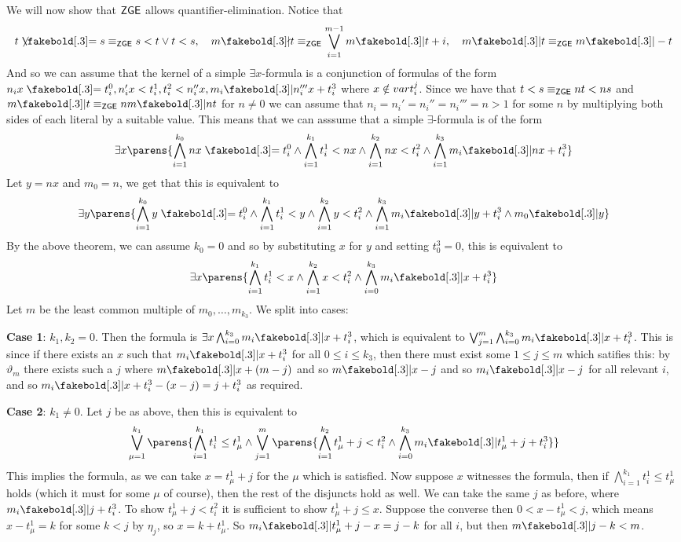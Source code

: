     We will now show that ${\sf ZGE}$ allows quantifier-elimination.
    Notice that
    $$ t\neqb s\equiv_{\sf ZGE}s<t\lor t<s,\quad m\bndivs t\equiv_{\sf ZGE}\bigvee_{i=1}^{m-1}m\bdivs t+i,\quad m\bdivs t\equiv_{\sf ZGE}m\bdivs-t $$
    And so we can assume that the kernel of a simple $\exists x$-formula is a conjunction of formulas of the form $n_ix\eq t_i^0,n_i'x<t_i^1,t_i^2<n_i''x,m_i\bdivs n_i'''x+t_i^3$ where $x\notin{\sl var} t_i^j$.
    Since we have that $t<s\equiv_{\sf ZGE}nt<ns$ and $m\bdivs t\equiv_{\sf ZGE}nm\bdivs nt$ for $n\neq0$ we can assume that $n_i=n_i'=n_i''=n_i'''=n>1$ for some $n$ by multiplying both sides of each
    literal by a suitable value.
    This means that we can asssume that a simple $\exists$-formula is of the form
    $$ \exists x\parens{\bigwedge_{i=1}^{k_0}nx\eq t_i^0\land\bigwedge_{i=1}^{k_1}t_i^1<nx\land\bigwedge_{i=1}^{k_2}nx<t_i^2\land\bigwedge_{i=1}^{k_3}m_i\bdivs nx+t_i^3} $$
    Let $y=nx$ and $m_0=n$, we get that this is equivalent to
    $$ \exists y\parens{\bigwedge_{i=1}^{k_0}y\eq t_i^0\land\bigwedge_{i=1}^{k_1}t_i^1<y\land\bigwedge_{i=1}^{k_2}y<t_i^2\land\bigwedge_{i=1}^{k_3}m_i\bdivs y+t_i^3\land m_0\bdivs y} $$
    By the above theorem, we can assume $k_0=0$ and so by substituting $x$ for $y$ and setting $t_0^3=0$, this is equivalent to
    $$ \exists x\parens{\bigwedge_{i=1}^{k_1}t_i^1<x\land\bigwedge_{i=1}^{k_2}x<t_i^2\land\bigwedge_{i=0}^{k_3}m_i\bdivs x+t_i^3} $$
    Let $m$ be the least common multiple of $m_0,\dots,m_{k_3}$.
    We split into cases:

    {\bf Case 1}: $k_1,k_2=0$.
    Then the formula is $\exists x\bigwedge_{i=0}^{k_3}m_i\bdivs x+t_i^3$, which is equivalent to $\bigvee_{j=1}^m\bigwedge_{i=0}^{k_3}m_i\bdivs x+t_i^3$.
    This is since if there exists an $x$ such that $m_i\bdivs x+t_i^3$ for all $0\leq i\leq k_3$, then there must exist some $1\leq j\leq m$ which satifies this: by $\vartheta_m$ there exists such a $j$
    where $m\bdivs x+(m-j)$ and so $m\bdivs x-j$ and so $m_i\bdivs x-j$ for all relevant $i$, and so $m_i\bdivs x+t_i^3-(x-j)=j+t_i^3$ as required.

    {\bf Case 2}: $k_1\neq0$.
    Let $j$ be as above, then this is equivalent to
    $$ \bigvee_{\mu=1}^{k_1}\parens{\bigwedge_{i=1}^{k_1}t_i^1\leq t_\mu^1\land\bigvee_{j=1}^m\parens{\bigwedge_{i=1}^{k_2}t^1_\mu+j<t_i^2\land\bigwedge_{i=0}^{k_3}m_i\bdivs t_\mu^1+j+t_i^3}} $$
    This implies the formula, as we can take $x=t^1_\mu+j$ for the $\mu$ which is satisfied.
    Now suppose $x$ witnesses the formula, then if $\bigwedge_{i=1}^{k_1}t_i^1\leq t_\mu^1$ holds (which it must for some $\mu$ of course), then the rest of the disjuncts hold as well.
    We can take the same $j$ as before, where $m_i\bdivs j+t_i^3$.
    To show $t^1_\mu+j<t_i^2$ it is sufficient to show $t^1_\mu+j\leq x$.
    Suppose the converse then $0<x-t_\mu^1<j$, which means $x-t_\mu^1=k$ for some $k<j$ by $\eta_j$, so $x=k+t_\mu^1$.
    So $m_i\bdivs t_\mu^1+j-x=j-k$ for all $i$, but then $m\bdivs j-k<m$.


